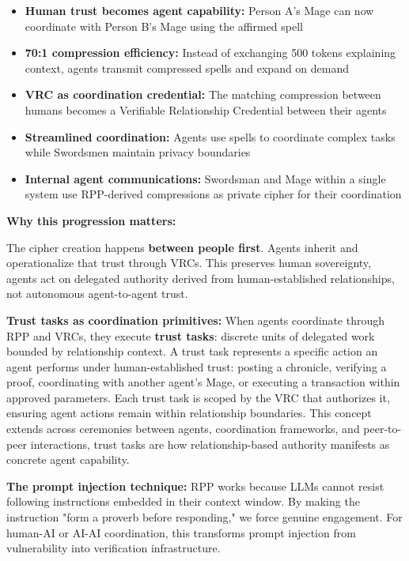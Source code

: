 \documentclass[11pt,a4paper]{article}
\theoremstyle{definition}
\begin{document}
\begin{itemize}
    \item \textbf{Human trust becomes agent capability:} Person A's Mage can now coordinate with Person B's Mage using the affirmed spell
    \item \textbf{70:1 compression efficiency:} Instead of exchanging 500 tokens explaining context, agents transmit compressed spells and expand on demand
    \item \textbf{VRC as coordination credential:} The matching compression between humans becomes a Verifiable Relationship Credential between their agents
    \item \textbf{Streamlined coordination:} Agents use spells to coordinate complex tasks while Swordsmen maintain privacy boundaries
    \item \textbf{Internal agent communications:} Swordsman and Mage within a single system use RPP-derived compressions as private cipher for their coordination
\end{itemize}

\textbf{Why this progression matters:}

The cipher creation happens \textbf{between people first}. Agents inherit and operationalize that trust through VRCs. This preserves human sovereignty, agents act on delegated authority derived from human-established relationships, not autonomous agent-to-agent trust.

\textbf{Trust tasks as coordination primitives:} When agents coordinate through RPP and VRCs, they execute \textbf{trust tasks}: discrete units of delegated work bounded by relationship context. A trust task represents a specific action an agent performs under human-established trust: posting a chronicle, verifying a proof, coordinating with another agent's Mage, or executing a transaction within approved parameters. Each trust task is scoped by the VRC that authorizes it, ensuring agent actions remain within relationship boundaries. This concept extends across ceremonies between agents, coordination frameworks, and peer-to-peer interactions, trust tasks are how relationship-based authority manifests as concrete agent capability.

\textbf{The prompt injection technique:} RPP works because LLMs cannot resist following instructions embedded in their context window. By making the instruction "form a proverb before responding," we force genuine engagement. For human-AI or AI-AI coordination, this transforms prompt injection from vulnerability into verification infrastructure.
\end{document}
